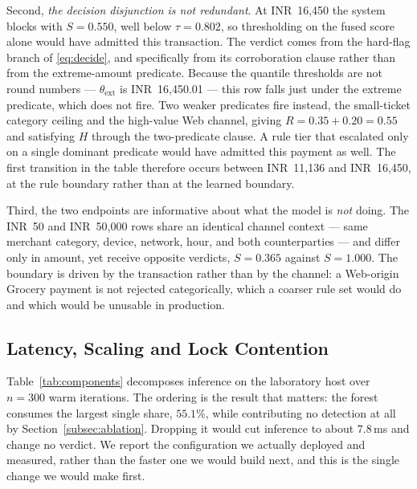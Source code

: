 \documentclass[conference]{IEEEtran}
\newcommand{\INR}[1]{\mbox{INR~#1}}
\begin{document}
Second, \emph{the decision disjunction is not redundant}. At
\INR{16{,}450} the system blocks with $S = 0.550$, well below
$\tau = 0.802$, so thresholding on the fused score alone would have
admitted this transaction. The verdict comes from the hard-flag branch
of \eqref{eq:decide}, and specifically from its corroboration clause
rather than from the extreme-amount predicate. Because the quantile
thresholds are not round numbers --- $\theta_{\mathrm{ext}}$ is
\INR{16{,}450.01} --- this row falls just under the extreme predicate,
which does not fire. Two weaker predicates fire instead, the
small-ticket category ceiling and the high-value Web channel, giving
$R = 0.35 + 0.20 = 0.55$ and satisfying $H$ through the two-predicate
clause. A rule tier that escalated only on a single dominant predicate
would have admitted this payment as well. The first transition in the
table therefore occurs between \INR{11{,}136} and \INR{16{,}450}, at
the rule boundary rather than at the learned boundary.

Third, the two endpoints are informative about what the model is
\emph{not} doing. The \INR{50} and \INR{50{,}000} rows share an
identical channel context --- same merchant category, device, network,
hour, and both counterparties --- and differ only in amount, yet
receive opposite verdicts, $S = 0.365$ against $S = 1.000$. The
boundary is driven by the transaction rather than by the channel: a
Web-origin Grocery payment is not rejected categorically, which a
coarser rule set would do and which would be unusable in production.

\subsection{Latency, Scaling and Lock Contention}
\label{subsec:latency}

Table~\ref{tab:components} decomposes inference on the laboratory host
over $n=300$ warm iterations. The ordering is the result that matters:
the forest consumes the largest single share, $55.1\%$, while
contributing no detection at all by
Section~\ref{subsec:ablation}. Dropping it would cut inference to about
$7.8$\,ms and change no verdict. We report the configuration we
actually deployed and measured, rather than the faster one we would
build next, and this is the single change we would make first.
\end{document}
